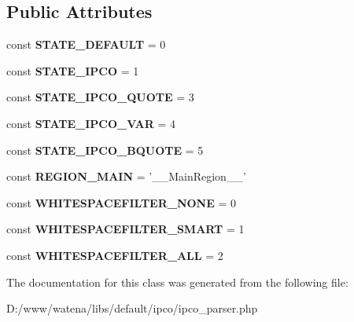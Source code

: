 \subsection*{Public Attributes}
\begin{DoxyCompactItemize}
\item 
\hypertarget{class_i_p_c_o___parser_a8cac4ef593473d07cf07de8935baf6cb}{const {\bfseries S\-T\-A\-T\-E\-\_\-\-D\-E\-F\-A\-U\-L\-T} = 0}\label{class_i_p_c_o___parser_a8cac4ef593473d07cf07de8935baf6cb}

\item 
\hypertarget{class_i_p_c_o___parser_aab675c2c1fee46fc0447d4656b85eadf}{const {\bfseries S\-T\-A\-T\-E\-\_\-\-I\-P\-C\-O} = 1}\label{class_i_p_c_o___parser_aab675c2c1fee46fc0447d4656b85eadf}

\item 
\hypertarget{class_i_p_c_o___parser_aeb825aa43d7610f855f9ebfc6ac1b298}{const {\bfseries S\-T\-A\-T\-E\-\_\-\-I\-P\-C\-O\-\_\-\-Q\-U\-O\-T\-E} = 3}\label{class_i_p_c_o___parser_aeb825aa43d7610f855f9ebfc6ac1b298}

\item 
\hypertarget{class_i_p_c_o___parser_afb3b079f611d921b2b5f99a267976252}{const {\bfseries S\-T\-A\-T\-E\-\_\-\-I\-P\-C\-O\-\_\-\-V\-A\-R} = 4}\label{class_i_p_c_o___parser_afb3b079f611d921b2b5f99a267976252}

\item 
\hypertarget{class_i_p_c_o___parser_a2b4cf6ea70e0fa9b4727f884e5f5a2d5}{const {\bfseries S\-T\-A\-T\-E\-\_\-\-I\-P\-C\-O\-\_\-\-B\-Q\-U\-O\-T\-E} = 5}\label{class_i_p_c_o___parser_a2b4cf6ea70e0fa9b4727f884e5f5a2d5}

\item 
\hypertarget{class_i_p_c_o___parser_abd9289d575fd7cf093f460e3369e78a7}{const {\bfseries R\-E\-G\-I\-O\-N\-\_\-\-M\-A\-I\-N} = '\-\_\-\-\_\-\-Main\-Region\-\_\-\-\_\-'}\label{class_i_p_c_o___parser_abd9289d575fd7cf093f460e3369e78a7}

\item 
\hypertarget{class_i_p_c_o___parser_a24da87cd5a62b6f82c5c1cbf2032c0b0}{const {\bfseries W\-H\-I\-T\-E\-S\-P\-A\-C\-E\-F\-I\-L\-T\-E\-R\-\_\-\-N\-O\-N\-E} = 0}\label{class_i_p_c_o___parser_a24da87cd5a62b6f82c5c1cbf2032c0b0}

\item 
\hypertarget{class_i_p_c_o___parser_a9aeec33961eb19b16270358de7c9e89e}{const {\bfseries W\-H\-I\-T\-E\-S\-P\-A\-C\-E\-F\-I\-L\-T\-E\-R\-\_\-\-S\-M\-A\-R\-T} = 1}\label{class_i_p_c_o___parser_a9aeec33961eb19b16270358de7c9e89e}

\item 
\hypertarget{class_i_p_c_o___parser_abb7acc95c20e78000c6c7d23ebda786d}{const {\bfseries W\-H\-I\-T\-E\-S\-P\-A\-C\-E\-F\-I\-L\-T\-E\-R\-\_\-\-A\-L\-L} = 2}\label{class_i_p_c_o___parser_abb7acc95c20e78000c6c7d23ebda786d}

\end{DoxyCompactItemize}


The documentation for this class was generated from the following file\-:\begin{DoxyCompactItemize}
\item 
D\-:/www/watena/libs/default/ipco/ipco\-\_\-parser.\-php\end{DoxyCompactItemize}
